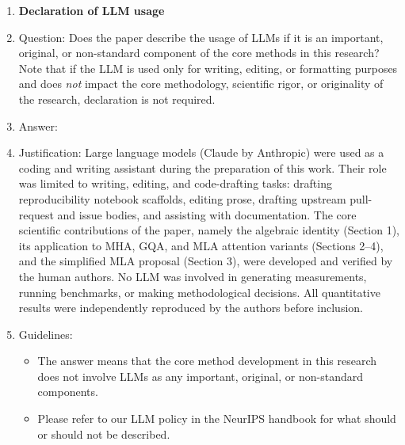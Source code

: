 \begin{enumerate}
\item {\bf Declaration of LLM usage}
    \item[] Question: Does the paper describe the usage of LLMs if it is an important, original, or non-standard component of the core methods in this research? Note that if the LLM is used only for writing, editing, or formatting purposes and does \emph{not} impact the core methodology, scientific rigor, or originality of the research, declaration is not required.
    \item[] Answer: \answerYes{} %
    \item[] Justification: Large language models (Claude by Anthropic) were used as a coding and writing assistant during the preparation of this work. Their role was limited to writing, editing, and code-drafting tasks: drafting reproducibility notebook scaffolds, editing prose, drafting upstream pull-request and issue bodies, and assisting with documentation. The core scientific contributions of the paper, namely the algebraic identity (Section 1), its application to MHA, GQA, and MLA attention variants (Sections 2--4), and the simplified MLA proposal (Section 3), were developed and verified by the human authors. No LLM was involved in generating measurements, running benchmarks, or making methodological decisions. All quantitative results were independently reproduced by the authors before inclusion.
    \item[] Guidelines:
    \begin{itemize}
        \item The answer \answerNA{} means that the core method development in this research does not involve LLMs as any important, original, or non-standard components.
        \item Please refer to our LLM policy in the NeurIPS handbook for what should or should not be described.
    \end{itemize}

\end{enumerate}
